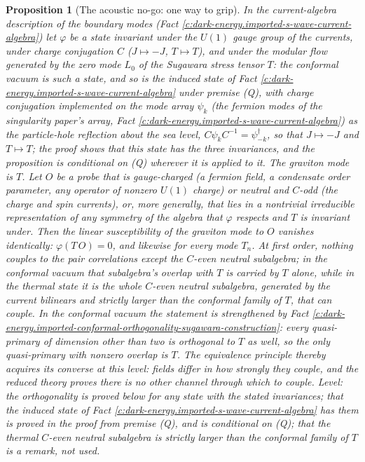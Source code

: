 \documentclass[11pt]{article}
\newtheorem{proposition}[theorem]{Proposition}
\theoremstyle{definition}
\theoremstyle{plain}
\begin{document}
\begin{proposition}[The acoustic no-go: one way to grip]\label{c:dark-energy.acoustic-no-go-one-way-grip}
In the current-algebra description of the boundary modes (Fact \ref{c:dark-energy.imported-s-wave-current-algebra}) let $\varphi$ be a state invariant under the $U(1)$ gauge group of the currents, under charge conjugation $C$ ($J \mapsto -J$, $T \mapsto T$), and under the modular flow generated by the zero mode $L_0$ of the Sugawara stress tensor $T$: the conformal vacuum is such a state, and so is the induced state of Fact \ref{c:dark-energy.imported-s-wave-current-algebra} under premise (Q), with charge conjugation implemented on the mode array $\psi_k$ (the fermion modes of the singularity paper's array, Fact \ref{c:dark-energy.imported-s-wave-current-algebra}) as the particle-hole reflection about the sea level, $C\psi_kC^{-1} = \psi^\dagger_{-k}$, so that $J \mapsto -J$ and $T \mapsto T$; the proof shows that this state has the three invariances, and the proposition is conditional on (Q) wherever it is applied to it. The graviton mode is $T$. Let $O$ be a probe that is gauge-charged (a fermion field, a condensate order parameter, any operator of nonzero $U(1)$ charge) or neutral and $C$-odd (the charge and spin currents), or, more generally, that lies in a nontrivial irreducible representation of any symmetry of the algebra that $\varphi$ respects and $T$ is invariant under. Then the linear susceptibility of the graviton mode to $O$ vanishes identically: $\varphi(T\,O) = 0$, and likewise for every mode $T_n$. At first order, nothing couples to the pair correlations except the $C$-even neutral subalgebra; in the conformal vacuum that subalgebra's overlap with $T$ is carried by $T$ alone, while in the thermal state it is the whole $C$-even neutral subalgebra, generated by the current bilinears and strictly larger than the conformal family of $T$, that can couple. In the conformal vacuum the statement is strengthened by Fact \ref{c:dark-energy.imported-conformal-orthogonality-sugawara-construction}: every quasi-primary of dimension other than two is orthogonal to $T$ as well, so the only quasi-primary with nonzero overlap is $T$. The equivalence principle thereby acquires its converse at this level: fields differ in how strongly they couple, and the reduced theory proves there is no other channel through which to couple. \emph{Level:} the orthogonality is proved below for any state with the stated invariances; that the induced state of Fact \ref{c:dark-energy.imported-s-wave-current-algebra} has them is proved in the proof from premise (Q), and is conditional on (Q); that the thermal $C$-even neutral subalgebra is strictly larger than the conformal family of $T$ is a remark, not used.
\end{proposition}
\end{document}
